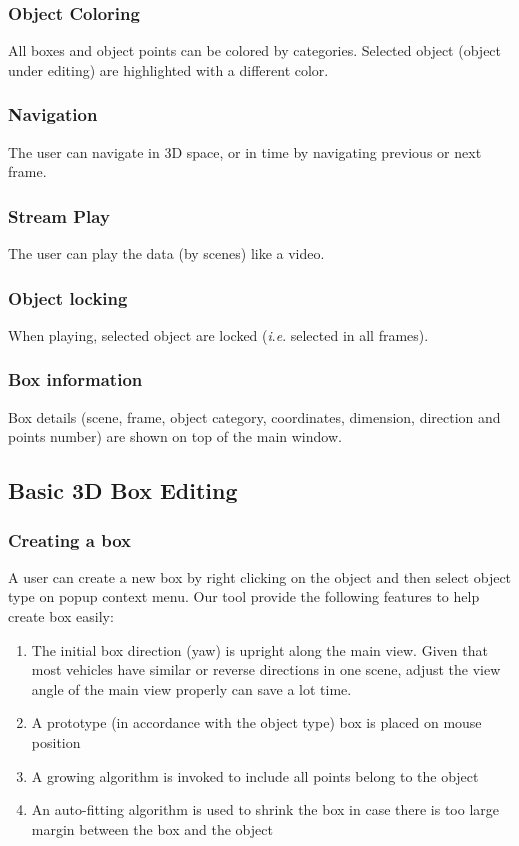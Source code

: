 \documentclass[letterpaper, 10 pt, conference]{ieeeconf}  %
\begin{document}
\subsubsection{Object Coloring}
All boxes and object points can be colored by categories. Selected object (object under editing) are highlighted with a different color.

\subsubsection{Navigation}
\label{section:navigation}
The user can navigate in 3D space, or in time by navigating previous or next frame. 

\subsubsection{Stream Play}
The user can play the data (by scenes) like a video.

\subsubsection{Object locking}
When playing, selected object are locked (\textit{i}.\textit{e}. selected in all frames).

\subsubsection{Box information}
Box details (scene, frame, object category, coordinates, dimension, direction and points number) are shown on top of the main window.
 
\subsection{Basic 3D Box Editing}

\subsubsection{Creating a box}
\label{section:create-box}
A user can create a new box by right clicking on the object  and then select object type on popup context menu. Our tool provide the following features to help create box easily:

\begin{enumerate}
	\item The initial box direction (yaw) is upright along the main view. Given that most vehicles have similar or reverse directions in one scene, adjust the view angle of the main view properly can save a lot time.
	\item A prototype (in accordance with the object type) box is placed on mouse position
	\item A growing algorithm is invoked to include all points belong to the object
	\item An auto-fitting algorithm is used to shrink the box in case there is too large margin between the box and the object
\end{enumerate}
\end{document}
